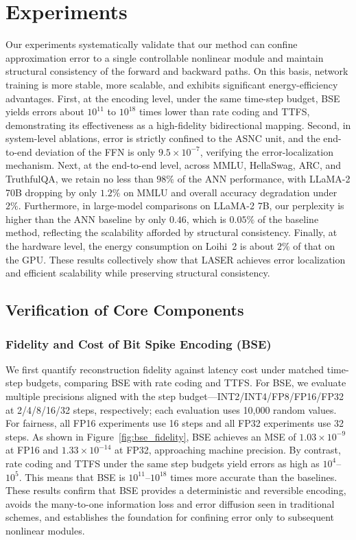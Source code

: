 \documentclass{article}
\theoremstyle{plain}
\theoremstyle{definition}
\theoremstyle{remark}
\begin{document}
\section{Experiments}
\label{sec:experiments}

Our experiments systematically validate that our method can confine approximation error to a single controllable nonlinear module and maintain structural consistency of the forward and backward paths. On this basis, network training is more stable, more scalable, and exhibits significant energy-efficiency advantages. First, at the encoding level, under the same time-step budget, BSE yields errors about $10^{11}$ to $10^{18}$ times lower than rate coding and TTFS, demonstrating its effectiveness as a high-fidelity bidirectional mapping. Second, in system-level ablations, error is strictly confined to the ASNC unit, and the end-to-end deviation of the FFN is only $9.5\times10^{-7}$, verifying the error-localization mechanism. Next, at the end-to-end level, across MMLU, HellaSwag, ARC, and TruthfulQA, we retain no less than $98\%$ of the ANN performance, with LLaMA-2 70B dropping by only $1.2\%$ on MMLU and overall accuracy degradation under $2\%$. Furthermore, in large-model comparisons on LLaMA-2 7B, our perplexity is higher than the ANN baseline by only $0.46$, which is $0.05\%$ of the baseline method, reflecting the scalability afforded by structural consistency. Finally, at the hardware level, the energy consumption on Loihi~2 is about $2\%$ of that on the GPU. These results collectively show that LASER achieves error localization and efficient scalability while preserving structural consistency.


\subsection{Verification of Core Components}
\label{subsec:verification_of_components}

\subsubsection{Fidelity and Cost of Bit Spike Encoding (BSE)}

We first quantify reconstruction fidelity against latency cost under matched time-step budgets, comparing BSE with rate coding and TTFS. For BSE, we evaluate multiple precisions aligned with the step budget—INT2/INT4/FP8/FP16/FP32 at 2/4/8/16/32 steps, respectively; each evaluation uses 10{,}000 random values. For fairness, all FP16 experiments use 16 steps and all FP32 experiments use 32 steps. As shown in Figure~\ref{fig:bse_fidelity}, BSE achieves an MSE of $1.03\times10^{-9}$ at FP16 and $1.33\times10^{-14}$ at FP32, approaching machine precision. By contrast, rate coding and TTFS under the same step budgets yield errors as high as $10^{4}$–$10^{5}$. This means that BSE is $10^{11}$–$10^{18}$ times more accurate than the baselines. These results confirm that BSE provides a deterministic and reversible encoding, avoids the many-to-one information loss and error diffusion seen in traditional schemes, and establishes the foundation for confining error only to subsequent nonlinear modules.
\end{document}

